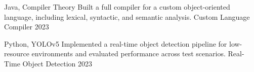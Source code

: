 \begin{cvhonors}

  \cvhonor
    {Java, Compiler Theory}
    {Built a full compiler for a custom object-oriented language, including lexical, syntactic, and semantic analysis.}
    {Custom Language Compiler}
    {2023}

  \cvhonor
    {Python, YOLOv5}
    {Implemented a real-time object detection pipeline for low-resource environments and evaluated performance across test scenarios.}
    {Real-Time Object Detection}
    {2023}

\end{cvhonors}
